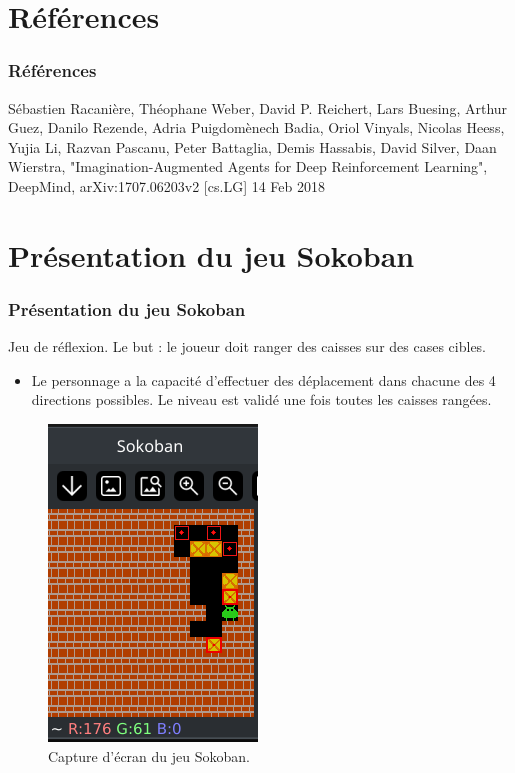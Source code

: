 \documentclass[
	11pt, %
]{beamer}
\begin{document}
\section{Références}

\begin{frame}
	\frametitle{Références}

	Sébastien Racanière, Théophane Weber, David P. Reichert, Lars Buesing, Arthur Guez, Danilo Rezende, Adria Puigdomènech Badia, Oriol Vinyals, Nicolas Heess, Yujia Li, Razvan Pascanu, Peter Battaglia, Demis Hassabis, David Silver, Daan Wierstra, "Imagination-Augmented Agents for Deep Reinforcement Learning", DeepMind, arXiv:1707.06203v2 [cs.LG] 14 Feb 2018

\end{frame}

\section{Présentation du jeu Sokoban}

\begin{frame}
	\frametitle{Présentation du jeu Sokoban}

	Jeu de \alert{réflexion}. Le but : le joueur doit ranger des caisses sur des cases cibles.
	\smallskip %

	\begin{itemize}
		\item Le personnage a la capacité d'effectuer des déplacement dans chacune des 4 directions possibles. Le niveau est validé une fois toutes les caisses rangées.
	\end{itemize}

	\smallskip %

	\begin{figure}
		\includegraphics[width=0.2\linewidth]{Images/sokaibanfailed2.png}
		\caption{Capture d'écran du jeu Sokoban.}
	\end{figure}	

\end{frame}
\end{document}
